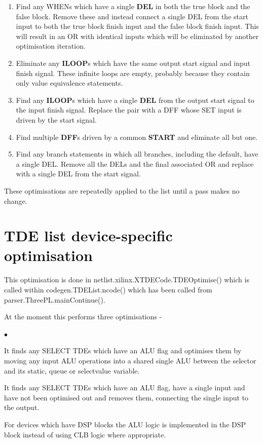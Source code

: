 \documentclass[10pt,a4paper,twoside,fleqn]{book}
\newcommand{\blist}{\begin{list}{$\bullet$}{\setlength{\itemsep}{-5pt}\setlength{\topsep}{-5pt}}}
\newcommand{\blend}{\end{list}}
\begin{document}
\begin{enumerate}
                eliminate them.
        \item   Find any WHENs which have a single {\bf DEL} in both the true
                block and the false block. Remove these and instead connect a
                single DEL from the start input to both the true block finish
                input and the false block finish input. This will result in
                an OR with identical inputs which will be eliminated by
                another optimisation iteration.
        \item   Eliminate any {\bf ILOOP}s which have the same output start
                signal and input finish signal. These infinite loops are
                empty, probably because they contain only value equivalence
                statements.
        \item   Find any {\bf ILOOP}s which have a single {\bf DEL} from the
                output start signal to the input finish signal. Replace the
                pair with a DFF whose SET input is driven by the start signal.
        \item   Find multiple {\bf DFF}s driven by a common {\bf START} and
                eliminate all but one.
        \item   Find any branch statements in which all branches, including
                the default, have a single DEL. Remove all the DELs and the
                final associated OR and replace with a single DEL from the
                start signal.
        \end{enumerate}
        
        These optimisations are repeatedly applied to the list until a pass
        makes no change.

    \section{TDE list device-specific optimisation}
    
        This optimisation is done in netlist.xilinx.XTDECode.TDEOptimise()
        which is called within codegen.TDEList.ncode() which has been
        called from parser.ThreePL.mainContinue().
        
        At the moment this performs three optimisations -
        \blist
        \item   It finds any SELECT TDEs which have an ALU flag and
                optimises them by moving any input ALU operations into a
                shared single ALU between the selector and its static, queue
                or selectvalue variable.
        \item   It finds any SELECT TDEs which have an ALU flag, have a
                single input and have not been optimised out and removes
                them, connecting the single input to the output.
        \item   For devices which have DSP blocks the ALU logic is implemented
                in the DSP block instead of using CLB logic where appropriate.
        \blend
\end{document}
